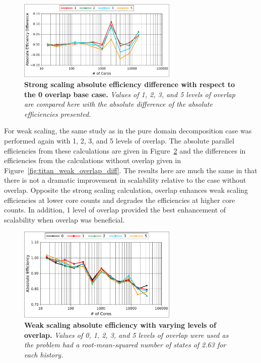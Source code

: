 \documentclass{snamc2013}
\begin{document}
\begin{figure}[h!]
  \begin{center}
    \includegraphics[width=3in]{titan_strong_overlap_diff.pdf}
  \end{center}
  \caption{\textbf{Strong scaling absolute efficiency difference with
      respect to the 0 overlap base case.} \textit{Values of 1, 2, 3,
      and 5 levels of overlap are compared here with the absolute
      difference of the absolute efficiencies presented.}}
  \label{fig:titan_strong_overlap_diff}
\end{figure}

For weak scaling, the same study as in the pure domain decomposition
case was performed again with 1, 2, 3, and 5 levels of overlap. The
absolute parallel efficiencies from these calculations are given in
Figure~\ref{fig:titan_weak_overlap} and the differences in
efficiencies from the calculations without overlap given in
Figure~\ref{fig:titan_weak_overlap_diff}. The results here are much
the same in that there is not a dramatic improvement in scalability
relative to the case without overlap. Opposite the strong scaling
calculation, overlap enhances weak scaling efficiencies at lower core
counts and degrades the efficiencies at higher core counts. In
addition, 1 level of overlap provided the best enhancement of
scalability when overlap was beneficial.

\begin{figure}[h!]
  \begin{center}
    \includegraphics[width=3in]{titan_weak_overlap.pdf}
  \end{center}
  \caption{\textbf{Weak scaling absolute efficiency with varying
      levels of overlap.} \textit{Values of 0, 1, 2, 3, and 5 levels
      of overlap were used as the problem had a root-mean-squared
      number of states of 2.63 for each history.}}
  \label{fig:titan_weak_overlap}
\end{figure}
\end{document}
